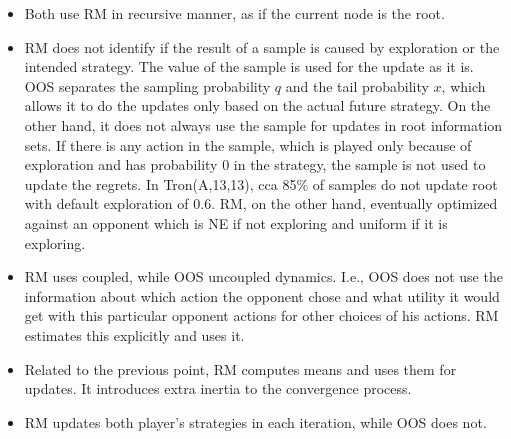 \documentclass[preprint,12pt]{elsarticle}
\begin{document}
\begin{itemize}
\item Both use RM in recursive manner, as if the current node is the root.
\item RM does not identify if the result of a sample is caused by exploration or the intended strategy. The value of the sample is used for the update as it is. OOS separates the sampling probability $q$ and the tail probability $x$, which allows it to do the updates only based on the actual future strategy. On the other hand, it does not always use the sample for updates in root information sets. If there is any action in the sample, which is played only because of exploration and has probability 0 in the strategy, the sample is not used to update the regrets. In Tron(A,13,13), cca 85\% of samples do not update root with default exploration of 0.6. RM, on the other hand, eventually optimized against an opponent which is NE if not exploring and uniform if it is exploring.
\item RM uses coupled, while OOS uncoupled dynamics. I.e., OOS does not use the information about which action the opponent chose and what utility it would get with this particular opponent actions for other choices of his actions. RM estimates this explicitly and uses it.
\item Related to the previous point, RM computes means and uses them for updates. It introduces extra inertia to the convergence process.
\item RM updates both player's strategies in each iteration, while OOS does not.

\end{itemize}
\end{document}
